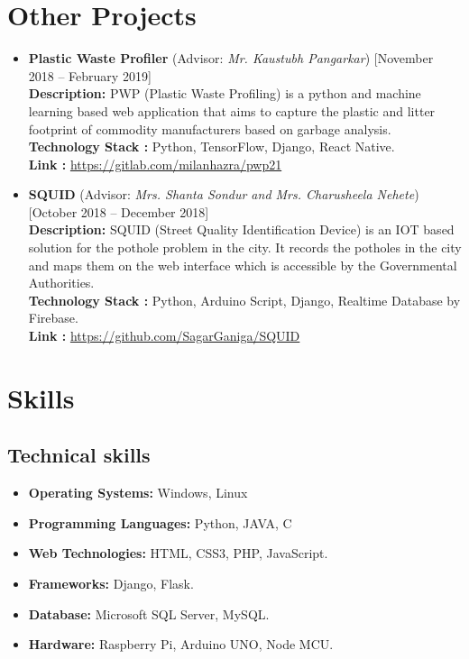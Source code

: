 \documentclass[11pt,a4paper]{moderncv}
\begin{document}
\section{Other Projects}
\begin{itemize}	
	
	\item\textbf{Plastic Waste Profiler} (Advisor: \textit{Mr. Kaustubh Pangarkar}) \hfill [November 2018 -- February 2019]\\
	\textbf{Description:}
	PWP (Plastic Waste Profiling) is a python and machine learning based web application that aims to capture the plastic and litter footprint of commodity manufacturers based on garbage analysis.\\
\textbf{Technology Stack :}  Python, TensorFlow, Django, React Native.\\
\textbf{Link :}  \url{https://gitlab.com/milanhazra/pwp21}\\
		
	\item\textbf{SQUID} (Advisor: \textit{Mrs. Shanta Sondur and Mrs. Charusheela Nehete}) \hfill [October 2018 -- December 2018]\\
	\textbf{Description:}
	SQUID (Street Quality Identification Device) is an IOT based solution for the pothole problem in the city. It records the potholes in the city and maps them on the web interface which is accessible by the Governmental Authorities.\\
\textbf{Technology Stack :} Python, Arduino Script, Django, Realtime Database by Firebase.\\
\textbf{Link :} \url{https://github.com/SagarGaniga/SQUID}
	
\end{itemize}

\section{Skills}
\subsection{\textbf{Technical skills}}

\begin{itemize}

	\item \textbf{Operating Systems:} Windows, Linux
	
	\item \textbf{Programming Languages:} Python, JAVA, C
	
	\item \textbf{Web Technologies: } HTML, CSS3, PHP, JavaScript.
	
	\item \textbf{Frameworks:} Django, Flask.
	
	\item \textbf{Database:}  Microsoft SQL Server, MySQL.
	
	\item \textbf{Hardware:}  Raspberry Pi, Arduino UNO, Node MCU.
\end{itemize}
	
\end{document}
